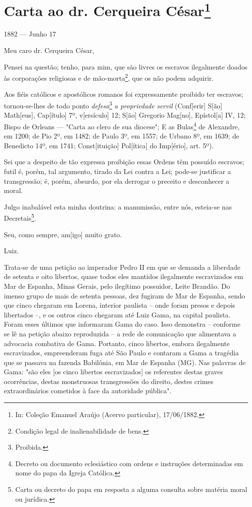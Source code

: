 {\chapter{Carta ao dr. Cerqueira César\footnote[*]{In: Coleção Emanuel
  Araújo (Acervo particular), 17/06/1882.}}


1882 --- Junho 17

Meu caro dr. Cerqueira César,

Pensei na questão; tenho, para mim, que são livres os escravos
ilegalmente doados às corporações religiosas e de mão-morta\footnote{
  Condição legal de inalienabilidade de bens.}, que os não podem
adquirir.

Aos fiéis católicos e apostólicos romanos foi expressamente proibido ter
escravos; tornou-se-lhes de todo ponto \emph{defesa}\footnote{
  Proibida.} \emph{a propriedade servil} (Conf{[}erir{]} S{[}ão{]}
Math{[}eus{]}, Cap{[}ítulo{]} 7º, v{[}ersículo{]} 12; S{[}ão{]} Gregorio
Mag{[}no{]}, Epístol{[}a{]} IV, 12; Bispo de Orleans --- "Carta ao
clero de sua diocese"; E as Bulas\footnote{Decreto ou documento
  eclesiástico com ordens e instruções determinadas em nome do papa da
  Igreja Católica.} de Alexandre, em 1200; de Pio 2º, em 1482; de Paulo
3º, em 1557; de Urbano 8º, em 1639; de Benedicto 14º, em 1741;
Const{[}ituição{]} Pol{[}ítica{]} do Imp{[}ério{]}, art. 5º).

Sei que a despeito de tão expressa proibição essas Ordens têm possuído
escravos; futil é, porém, tal argumento, tirado da Lei contra a Lei;
pode-se justificar a transgressão; é, porém, absurdo, por ela derrogar o
preceito e desconhecer a moral.

Julgo inabalável esta minha doutrina: a manumissão, entre nós, esteia-se
nas Decretais\footnote{Carta ou decreto do papa em resposta a alguma
  consulta sobre matéria moral ou jurídica.}.

Seu, como sempre,
am{[}igo{]} muito grato.

Luiz.

\pagebreak
\mbox{}\vfill
\thispagestyle{empty}

{\small\noindent
Trata-se de uma petição ao imperador Pedro II em que se demanda a
liberdade de setenta e oito libertos, quase todos eles mantidos
ilegalmente escravizados em Mar de Espanha, Minas Gerais, pelo ilegítimo
possuidor, Leite Brandão. Do imenso grupo de mais de setenta pessoas,
dez fugiram de Mar de Espanha, sendo que cinco chegaram em Lorena,
interior paulista -- onde foram presos e depois libertados --, e os
outros cinco chegaram até Luiz Gama, na capital paulista. Foram esses
últimos que informaram Gama do caso. Isso demonstra -- conforme se lê na
petição abaixo reproduzida -- a rede de comunicação que alimentava a
advocacia combativa de Gama. Portanto, cinco libertos, embora
ilegalmente escravizados, empreenderam fuga até São Paulo e contaram a
Gama a tragédia que se passava na fazenda Babilônia, em Mar de Espanha
(MG). Nas palavras de Gama: "são eles {[}os cinco libertos
escravizados{]} os referentes destas graves ocorrências, destas
monstruosas transgressões do direito, destes crimes extraordinários
cometidos à face da autoridade pública". }

}
